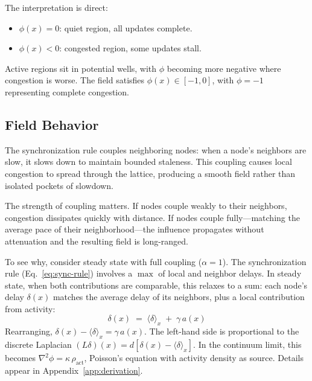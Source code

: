 \documentclass[aps, pra, reprint, superscriptaddress, nofootinbib, singlespacing]{revtex4-2}
\begin{document}
The interpretation is direct:
\begin{itemize}
    \item $\phi(x) = 0$: quiet region, all updates complete.
    \item $\phi(x) < 0$: congested region, some updates stall.
\end{itemize}

Active regions sit in potential wells, with $\phi$ becoming more negative where congestion is worse. The field satisfies $\phi(x) \in [-1, 0]$, with $\phi = -1$ representing complete congestion.

\subsection{Field Behavior}
\label{subsec:field_behavior}

The synchronization rule couples neighboring nodes: when a node's neighbors are slow, it slows down to maintain bounded staleness. This coupling causes local congestion to spread through the lattice, producing a smooth field rather than isolated pockets of slowdown.

The strength of coupling matters. If nodes couple weakly to their neighbors, congestion dissipates quickly with distance. If nodes couple fully—matching the average pace of their neighborhood—the influence propagates without attenuation and the resulting field is long-ranged.

To see why, consider steady state with full coupling ($\alpha = 1$). The synchronization rule (Eq.~\ref{eq:sync-rule}) involves a $\max$ of local and neighbor delays. In steady state, when both contributions are comparable, this relaxes to a sum: each node's delay $\delta(x)$ matches the average delay of its neighbors, plus a local contribution from activity:
\begin{equation}
    \delta(x) \;=\; \langle\delta\rangle_x \;+\; \gamma\, a(x)
    \label{eq:heuristic}
\end{equation}
Rearranging, $\delta(x) - \langle\delta\rangle_x = \gamma\, a(x)$. The left-hand side is proportional to the discrete Laplacian $(L\delta)(x) = d[\delta(x) - \langle\delta\rangle_x]$. In the continuum limit, this becomes $\nabla^2\phi = \kappa\,\rho_{\mathrm{act}}$, Poisson's equation with activity density as source. Details appear in Appendix~\ref{app:derivation}.
\end{document}
